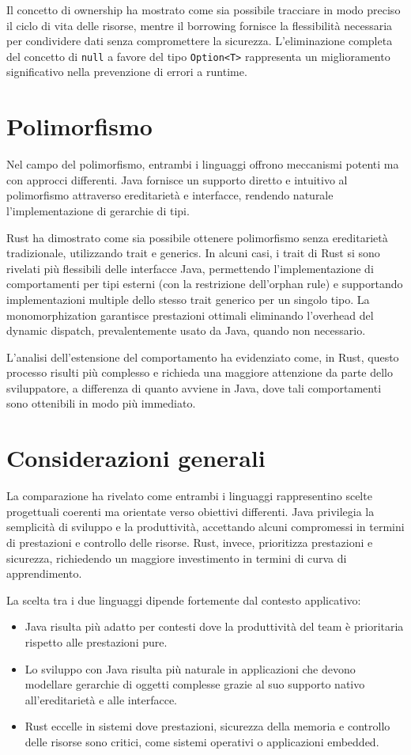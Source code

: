 Il concetto di ownership ha mostrato come sia possibile tracciare in modo preciso il ciclo di vita delle risorse, mentre il borrowing fornisce la flessibilità necessaria per condividere dati senza compromettere la sicurezza. L'eliminazione completa del concetto di \texttt{null} a favore del tipo \texttt{Option<T>} rappresenta un miglioramento significativo nella prevenzione di errori a runtime.

\section{Polimorfismo}
Nel campo del polimorfismo, entrambi i linguaggi offrono meccanismi potenti ma con approcci differenti. Java fornisce un supporto diretto e intuitivo al polimorfismo attraverso ereditarietà e interfacce, rendendo naturale l'implementazione di gerarchie di tipi.

Rust ha dimostrato come sia possibile ottenere polimorfismo senza ereditarietà tradizionale, utilizzando trait e generics. In alcuni casi, i trait di Rust si sono rivelati più flessibili delle interfacce Java, permettendo l'implementazione di comportamenti per tipi esterni (con la restrizione dell'orphan rule) e supportando implementazioni multiple dello stesso trait generico per un singolo tipo. La monomorphization garantisce prestazioni ottimali eliminando l'overhead del dynamic dispatch, prevalentemente usato da Java, quando non necessario.

L'analisi dell'estensione del comportamento ha evidenziato come, in Rust, questo processo risulti più complesso e richieda una maggiore attenzione da parte dello sviluppatore, a differenza di quanto avviene in Java, dove tali comportamenti sono ottenibili in modo più immediato.
\section{Considerazioni generali}
La comparazione ha rivelato come entrambi i linguaggi rappresentino scelte progettuali coerenti ma orientate verso obiettivi differenti. Java privilegia la semplicità di sviluppo e la produttività, accettando alcuni compromessi in termini di prestazioni e controllo delle risorse. Rust, invece, prioritizza prestazioni e sicurezza, richiedendo un maggiore investimento in termini di curva di apprendimento.

La scelta tra i due linguaggi dipende fortemente dal contesto applicativo:
\begin{itemize}
    \item Java risulta più adatto per contesti dove la produttività del team è prioritaria rispetto alle prestazioni pure.
    \item Lo sviluppo con Java risulta più naturale in applicazioni che devono modellare gerarchie di oggetti complesse grazie al suo supporto nativo all'ereditarietà e alle interfacce.
    \item Rust eccelle in sistemi dove prestazioni, sicurezza della memoria e controllo delle risorse sono critici, come sistemi operativi o applicazioni embedded.
\end{itemize}

